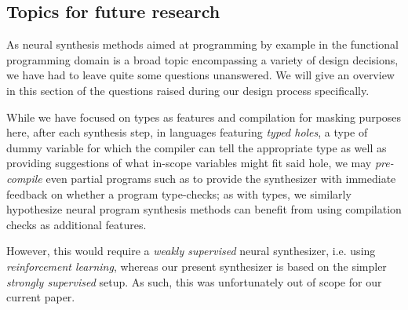 \documentclass{article}
\begin{document}
\subsection{Topics for future research}

As neural synthesis methods aimed at programming by example in the functional
programming domain is a broad topic encompassing a variety of design decisions,
we have had to leave quite some questions unanswered.
We will give an overview in this section of the questions raised during our design process specifically.


    While we have focused on types as features and compilation for masking purposes here,
    after each synthesis step, in languages featuring \emph{typed holes},
    a type of dummy variable for which the compiler can tell the appropriate type
    as well as providing suggestions of what in-scope variables might fit said hole,
    we may \emph{pre-compile} even partial programs such as to provide the synthesizer with immediate feedback on whether a program type-checks;
    as with types, we similarly hypothesize neural program synthesis methods can benefit from using compilation checks as additional features.

    However, this would require a \emph{weakly supervised} neural synthesizer,
    i.e. using \emph{reinforcement learning},
    whereas our present synthesizer is based on the simpler \emph{strongly supervised} setup.
    As such, this was unfortunately out of scope for our current paper.
\end{document}
